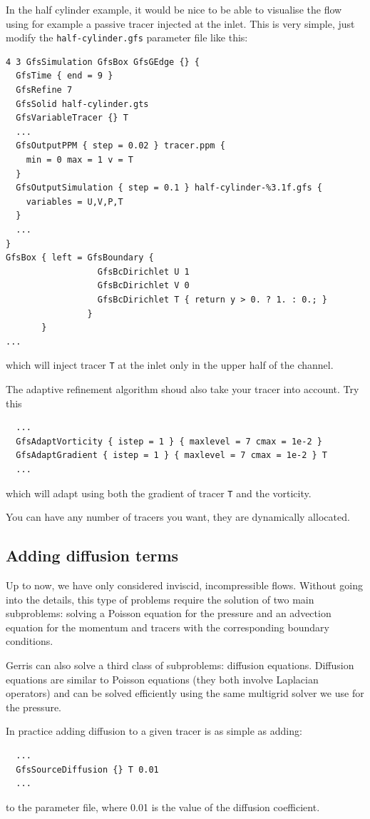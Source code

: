 \documentclass[a4paper]{article}
\begin{document}
In the half cylinder example, it would be nice to be able to visualise
the flow using for example a passive tracer injected at the inlet.
This is very simple, just modify the {\tt half-cylinder.gfs} parameter
file like this:
\begin{verbatim}
4 3 GfsSimulation GfsBox GfsGEdge {} {
  GfsTime { end = 9 }
  GfsRefine 7
  GfsSolid half-cylinder.gts
  GfsVariableTracer {} T
  ...
  GfsOutputPPM { step = 0.02 } tracer.ppm {
    min = 0 max = 1 v = T
  }
  GfsOutputSimulation { step = 0.1 } half-cylinder-%3.1f.gfs {
    variables = U,V,P,T
  }
  ...
}
GfsBox { left = GfsBoundary {
                  GfsBcDirichlet U 1
                  GfsBcDirichlet V 0
                  GfsBcDirichlet T { return y > 0. ? 1. : 0.; }
                } 
       }
...
\end{verbatim}
which will inject tracer {\tt T} at the inlet only in the upper half
of the channel.

The adaptive refinement algorithm shoud also take your tracer into account. Try this
\begin{verbatim}
  ...
  GfsAdaptVorticity { istep = 1 } { maxlevel = 7 cmax = 1e-2 }
  GfsAdaptGradient { istep = 1 } { maxlevel = 7 cmax = 1e-2 } T
  ...
\end{verbatim}
which will adapt using both the gradient of tracer {\tt T} and the vorticity.

You can have any number of tracers you want, they are dynamically
allocated.

\subsection{Adding diffusion terms}

Up to now, we have only considered inviscid, incompressible flows.
Without going into the details, this type of problems require the
solution of two main subproblems: solving a Poisson equation for the
pressure and an advection equation for the momentum and tracers with
the corresponding boundary conditions.

Gerris can also solve a third class of subproblems: diffusion
equations. Diffusion equations are similar to Poisson equations (they
both involve Laplacian operators) and can be solved efficiently using
the same multigrid solver we use for the pressure.

In practice adding diffusion to a given tracer is as simple as adding:
\begin{verbatim}
  ...
  GfsSourceDiffusion {} T 0.01
  ...
\end{verbatim}
to the parameter file, where 0.01 is the value of the diffusion
coefficient.
\end{document}
